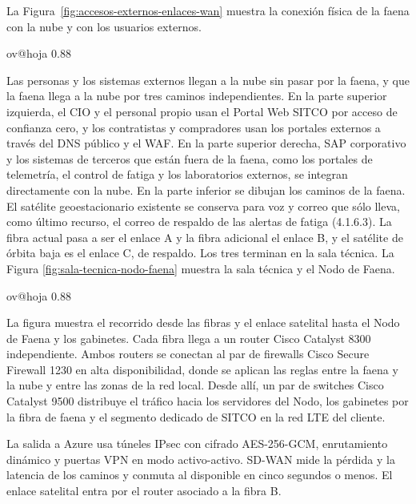 \documentclass[subdoc]{../../comun/overfore}
\begin{document}
La Figura~\ref{fig:accesos-externos-enlaces-wan} muestra la conexión física de la faena con la nube y con los usuarios externos.

\begin{horizontal}
\csname ov@hoja\endcsname{330.2mm}{215.9mm}
\expandafter\def\csname ov@altofig\endcsname{0.88}
\end{horizontal}
Las personas y los sistemas externos llegan a la nube sin pasar por la faena, y que la faena llega a la nube por tres caminos independientes. En la parte superior izquierda, el CIO y el personal propio usan el Portal Web SITCO por acceso de confianza cero, y los contratistas y compradores usan los portales externos a través del DNS público y el WAF. En la parte superior derecha, SAP corporativo y los sistemas de terceros que están fuera de la faena, como los portales de telemetría, el control de fatiga y los laboratorios externos, se integran directamente con la nube. En la parte inferior se dibujan los caminos de la faena. El satélite geoestacionario existente se conserva para voz y correo que sólo lleva, como último recurso, el correo de respaldo de las alertas de fatiga (4.1.6.3). La fibra actual pasa a ser el enlace A y la fibra adicional el enlace B, y el satélite de órbita baja es el enlace C, de respaldo. Los tres terminan en la sala técnica. La Figura \ref{fig:sala-tecnica-nodo-faena} muestra la sala técnica y el Nodo de Faena.

\begin{horizontal}
\csname ov@hoja\endcsname{330.2mm}{215.9mm}
\expandafter\def\csname ov@altofig\endcsname{0.88}
\end{horizontal}
La figura muestra el recorrido desde las fibras y el enlace satelital hasta el Nodo de Faena y los gabinetes. Cada fibra llega a un router Cisco Catalyst 8300 independiente. Ambos routers se conectan al par de firewalls Cisco Secure Firewall 1230 en alta disponibilidad, donde se aplican las reglas entre la faena y la nube y entre las zonas de la red local. Desde allí, un par de switches Cisco Catalyst 9500 distribuye el tráfico hacia los servidores del Nodo, los gabinetes por la fibra de faena y el segmento dedicado de SITCO en la red LTE del cliente.

La salida a Azure usa túneles IPsec con cifrado AES-256-GCM, enrutamiento dinámico y puertas VPN en modo activo-activo. SD-WAN mide la pérdida y la latencia de los caminos y conmuta al disponible en cinco segundos o menos. El enlace satelital entra por el router asociado a la fibra B.
\end{document}
